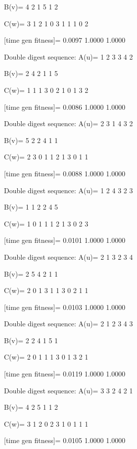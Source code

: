 B(v)=
     4     2     1     5     1     2

C(w)=
     3     1     2     1     0     3     1     1     1     0     2

[time gen fitness]=
    0.0097    1.0000    1.0000

Double digest sequence:
A(u)=
     1     2     3     3     4     2

B(v)=
     2     4     2     1     1     5

C(w)=
     1     1     1     3     0     2     1     0     1     3     2

[time gen fitness]=
    0.0086    1.0000    1.0000

Double digest sequence:
A(u)=
     2     3     1     4     3     2

B(v)=
     5     2     2     4     1     1

C(w)=
     2     3     0     1     1     2     1     3     0     1     1

[time gen fitness]=
    0.0088    1.0000    1.0000

Double digest sequence:
A(u)=
     1     2     4     3     2     3

B(v)=
     1     1     2     2     4     5

C(w)=
     1     0     1     1     1     2     1     3     0     2     3

[time gen fitness]=
    0.0101    1.0000    1.0000

Double digest sequence:
A(u)=
     2     1     3     2     3     4

B(v)=
     2     5     4     2     1     1

C(w)=
     2     0     1     3     1     1     3     0     2     1     1

[time gen fitness]=
    0.0103    1.0000    1.0000

Double digest sequence:
A(u)=
     2     1     2     3     4     3

B(v)=
     2     2     4     1     5     1

C(w)=
     2     0     1     1     1     3     0     1     3     2     1

[time gen fitness]=
    0.0119    1.0000    1.0000

Double digest sequence:
A(u)=
     3     3     2     4     2     1

B(v)=
     4     2     5     1     1     2

C(w)=
     3     1     2     0     2     3     1     0     1     1     1

[time gen fitness]=
    0.0105    1.0000    1.0000

